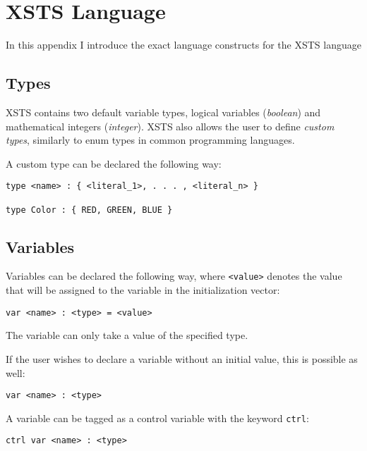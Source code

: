 \section{XSTS Language}\label{sec:xsts_language}

In this appendix I introduce the exact language constructs for the XSTS language 

\subsection*{Types}

XSTS contains two default variable types, logical variables (\emph{boolean}) and mathematical integers (\emph{integer}). XSTS also allows the user to define \emph{custom types}, similarly to enum types in common programming languages.

A custom type can be declared the following way:

\begin{lstlisting}[language=xsts]
type <name> : { <literal_1>, . . . , <literal_n> }

type Color : { RED, GREEN, BLUE }
\end{lstlisting}

\subsection*{Variables}

Variables can be declared the following way, where \verb|<value>| denotes the value that will be assigned to the variable in the initialization vector:

\begin{lstlisting}[language=xsts]
var <name> : <type> = <value>
\end{lstlisting}

The variable can only take a value of the specified type.

If the user wishes to declare a variable without an initial value, this is possible as well:

\begin{lstlisting}[language=xsts]
var <name> : <type>
\end{lstlisting}

A variable can be tagged as a control variable with the keyword \verb|ctrl|:

\begin{lstlisting}[language=xsts]
ctrl var <name> : <type>
\end{lstlisting}

